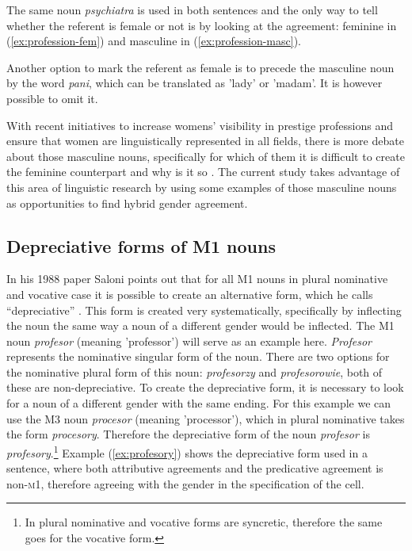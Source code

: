 The same noun \textsl{psychiatra} is used in both sentences and the only way to tell whether the referent is female or not is by looking at the agreement: feminine in (\ref{ex:profession-fem}) and masculine in (\ref{ex:profession-masc}).

Another option to mark the referent as female is to precede the masculine noun by the word \textsl{pani}, which can be translated as 'lady' or 'madam'. It is however possible to omit it.

With recent initiatives to increase womens' visibility in prestige professions and ensure that women are linguistically represented in all fields, there is more debate about those masculine nouns, specifically for which of them it is difficult to create the feminine counterpart and why is it so \citep{szpyra-kozlowska_premiera_2019, szpyra-kozlowska_czy_2022}. The current study takes advantage of this area of linguistic research by using some examples of those masculine nouns as opportunities to find hybrid gender agreement.

\subsection{Depreciative forms of M1 nouns}
In his 1988 paper Saloni points out that for all M1 nouns in plural nominative and vocative case it is possible to create an alternative form, which he calls ``depreciative'' \citep{saloni_o_1988}. This form is created very systematically, specifically by inflecting the noun the same way a noun of a different gender would be inflected. The M1 noun \textsl{profesor} (meaning 'professor') will serve as an example here. \textsl{Profesor} represents the nominative singular form of the noun. There are two options for the nominative plural form of this noun: \textsl{profesorzy} and \textsl{profesorowie}, both of these are non-depreciative. To create the depreciative form, it is necessary to look for a noun of a different gender with the same ending. For this example we can use the M3 noun \textsl{procesor} (meaning 'processor'), which in plural nominative takes the form \textsl{procesory}. Therefore the depreciative form of the noun \textsl{profesor} is \textsl{profesory}.\footnote{In plural nominative and vocative forms are syncretic, therefore the same goes for the vocative form.} Example (\ref{ex:profesory}) shows the depreciative form used in a sentence, where both attributive agreements and the predicative agreement is non-\textsc{m1}, therefore agreeing with the gender in the specification of the cell.

